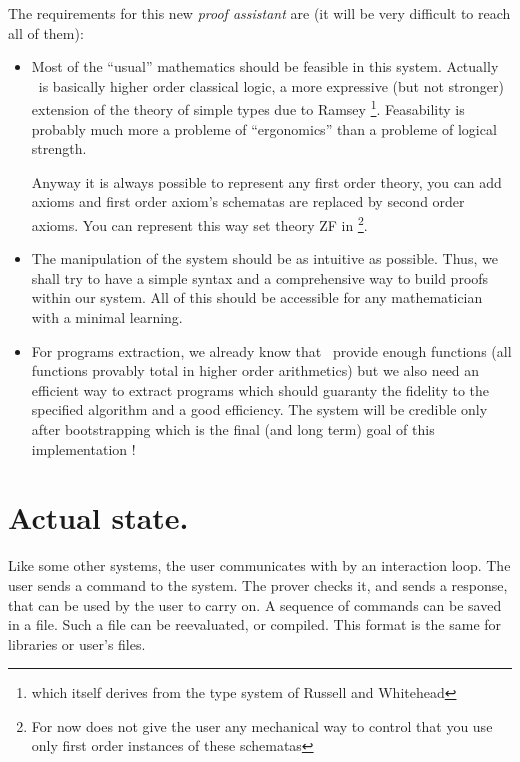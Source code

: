 The requirements for this new {\em proof assistant} are (it will be very
difficult to reach all of them):
\begin{itemize}
\item Most of the ``usual'' mathematics should be feasible in this
  system. Actually \AFD\ is basically higher order classical logic, a
  more expressive (but not stronger) extension of the theory of simple
  types due to Ramsey \cite{Ra25}\footnote{which itself derives from the
    type system of Russell and Whitehead}. Feasability is probably much
  more a probleme of ``ergonomics'' than a probleme of logical strength.

  Anyway it is always possible to represent any first order theory, you
  can add axioms and first order axiom's schematas are replaced by
  second order axioms. You can represent this way set theory ZF in
  \AFD\footnote{For now \AFD{} does not give the user any mechanical way to
    control that you use only first order instances of these schematas}.


\item The manipulation of the system should be as intuitive as possible. Thus,
we shall try to have a simple syntax and a comprehensive way to build proofs
within our system. All of this should be accessible for any mathematician with
a minimal learning.

\item For programs extraction, we already know that \AFD\ provide enough
  functions (all functions provably total in higher order arithmetics) but we
  also need an efficient way to extract programs which should guaranty the
  fidelity to the specified algorithm and a good efficiency. The system will
  be credible only after bootstrapping which is the final (and long term) goal
  of this implementation !

\end{itemize}


\section{Actual state.}

Like some other systems, the user communicates with \AFD{} by an
interaction loop. The user sends a command to the system. The prover
checks it, and sends a response, that can be used by the user to carry
on. A sequence of commands can be saved in a file. Such a file can be
reevaluated, or compiled. This format is the same for libraries or
user's files.

